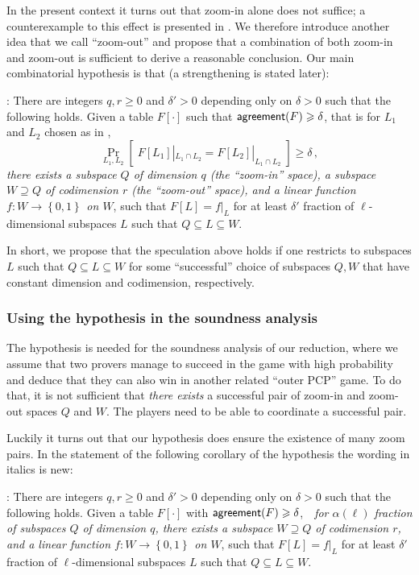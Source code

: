 \documentclass{toc}
\newcommand\set[1]{{\left\{ #1 \right\}}}
\newcommand\Prob[2]{{\Pr_{#1}\left[ {#2} \right]}}
\newcommand\power[1]{\set{0,1}^{#1}}
\renewcommand\geq{\geqslant}
\renewcommand\ge{\geqslant}
\def\agr{{\sf agreement}}
\begin{document}
In the present context it turns out that zoom-in alone does
not suffice; a counterexample to this effect is presented in
. We therefore introduce another idea that we call
``zoom-out'' and propose that a combination of both zoom-in and zoom-out is
sufficient to derive a reasonable conclusion. Our main combinatorial hypothesis
is that (a strengthening is stated later):

\medskip
{}: There are
integers $q, r \geq 0$ and %
$\delta' > 0$ depending only on
$\delta > 0$ such that the following holds. Given a table $F[\cdot]$
such that $\agr(F)\ge \delta$, that is  for $L_1$ and $L_2$ chosen as in
,
\[ \Prob{L_1,L_2}{\;F[L_1]|_{L_1\cap L_2} = F[L_2]|_{L_1\cap L_2}\;}\ge\delta \,,
\]
{\it there exists a subspace $Q$ of dimension $q$ (the ``zoom-in'' space),
a subspace $W \supseteq Q$ of codimension %
$r$ (the ``zoom-out'' space), and a linear function $f:W \to \power{}$ on $W$}, such that $F[L] = f|_L$ for at least  $\delta'$ fraction of $\ell$-dimensional
subspaces $L$ such that $Q \subseteq L \subseteq W$.

\medskip In short, we propose that the speculation above holds if one restricts to subspaces $L$ such that $Q \subseteq L \subseteq W$ for some ``successful'' choice of
subspaces $Q, W$ that have constant dimension and codimension, %
respectively.



\subsubsection{Using the hypothesis in the soundness analysis}
The hypothesis is needed for the soundness
analysis of our reduction, where we assume that two provers manage to
succeed in the game with high probability and deduce that they can
also win in another related ``outer PCP'' game. To do that, it is not
sufficient that {\em there exists} a successful pair of zoom-in and
zoom-out spaces $Q$ and $W$. The players need to be able to coordinate a successful pair.

Luckily it turns out that our hypothesis does ensure the existence of
many zoom pairs. In the statement of the following corollary of the
hypothesis the wording in italics is new:


\medskip
{}:
There are integers $q, r \geq 0$ and %
$\delta' > 0$ depending
only on $\delta > 0$ such that the following holds. Given a table
$F[\cdot]$ with $\agr(F)\ge\delta$,\ \  {\it for $\alpha(\ell)$ fraction
  of subspaces $Q$ of dimension $q$, there exists a subspace
  $W \supseteq Q$ of codimension %
  $r$, and a linear function
  $f:W \to \power{}$ on $W$}, such that $F[L] = f|_L$ for at least
$\delta'$ fraction of $\ell$-dimensional subspaces $L$ such that
$Q \subseteq L \subseteq W$.
\end{document}

